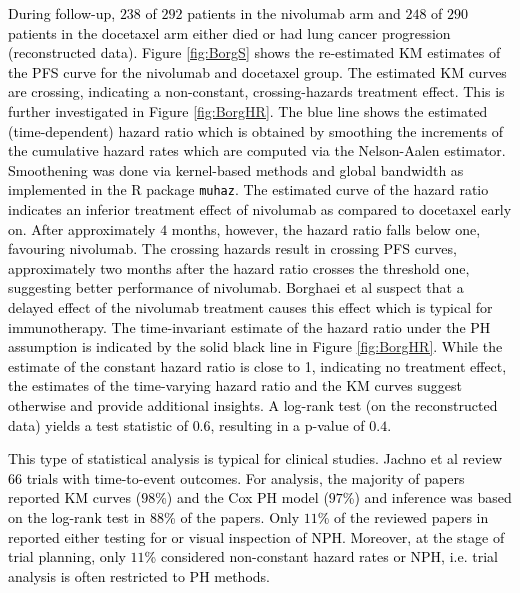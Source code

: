 \documentclass{article}
\newcommand{\NEW}[2][black]{\textcolor{#1}{#2}}
\begin{document}
\noindent \NEW{During follow-up, $238$ of $292$ patients in the nivolumab arm and $248$ of $290$ patients in the docetaxel arm either died or had lung cancer progression (reconstructed data). 
Figure \ref{fig:BorgS} shows the re-estimated KM estimates of the PFS curve for the nivolumab and docetaxel group. 
The estimated KM curves are crossing, indicating a non-constant, crossing-hazards treatment effect.
This is further investigated in Figure \ref{fig:BorgHR}. 
The blue line shows the estimated (time-dependent) hazard ratio which is obtained by smoothing the increments of the cumulative hazard rates which are computed via the Nelson-Aalen estimator.
Smoothening was done via kernel-based methods and global bandwidth as implemented in the R package \texttt{muhaz}.
The estimated curve of the hazard ratio indicates an inferior treatment effect of nivolumab as compared to docetaxel early on. After approximately $4$ months, however, the hazard ratio falls below one, favouring nivolumab.
The crossing hazards result in crossing PFS curves, approximately two months after the hazard ratio crosses the threshold one, suggesting better performance of nivolumab.
Borghaei et al \cite{Borghaei.2015} suspect that a delayed effect of the nivolumab treatment causes this effect which is typical for immunotherapy.
The time-invariant estimate of the hazard ratio under the PH assumption is indicated by the solid black line in Figure \ref{fig:BorgHR}. 
While the estimate of the constant hazard ratio is close to 1, indicating no treatment effect, the estimates of the time-varying hazard ratio and the KM curves suggest otherwise and provide additional insights.
A log-rank test (on the reconstructed data) yields a test statistic of $0.6$, resulting in a p-value of $0.4$.}

\noindent \NEW{This type of statistical analysis is typical for clinical studies.
Jachno et al \cite{Jachno.2019} review 66 trials with time-to-event outcomes. 
For analysis, the majority of papers reported KM curves ($98$\%) and the Cox PH model ($97$\%) and inference was based on the log-rank test in $88$\% of the papers.
Only $11$\% of the reviewed papers in \cite{Jachno.2019} reported either testing for or visual inspection of NPH.
Moreover, at the stage of trial planning, only $11$\% considered non-constant hazard rates or NPH,
i.e. trial analysis is often restricted to PH methods.
}

\end{document}
